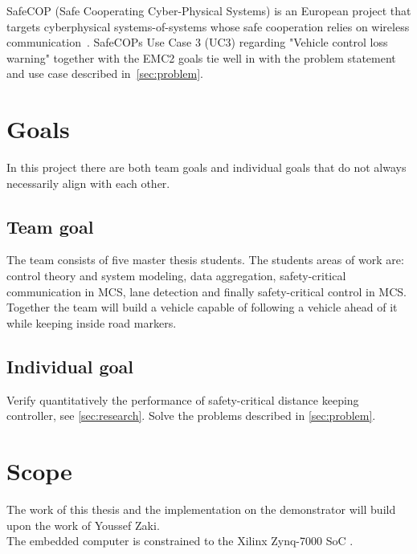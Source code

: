 SafeCOP (Safe Cooperating Cyber-Physical Systems) is an European project that targets cyberphysical systems-of-systems whose safe cooperation relies on wireless communication~\cite{safecop2016}. SafeCOPs Use Case 3 (UC3) regarding "Vehicle control loss warning" together with the EMC2 goals tie well in with the problem statement and use case described in~\ref{sec:problem}. %

\section{Goals}
In this project there are both team goals and individual goals that do not always necessarily align with each other.

\subsection{Team goal}
The team consists of five master thesis students. The students areas of work are: control theory and system modeling, data aggregation, safety-critical communication in MCS, lane detection and finally safety-critical control in MCS. Together the team will build a vehicle capable of following a vehicle ahead of it while keeping inside road markers.

\subsection{Individual goal}
Verify quantitatively the performance of safety-critical distance keeping controller, see \ref{sec:research}. Solve the problems described in \ref{sec:problem}.

\section{Scope}
\label{sec:scope}
The work of this thesis and the implementation on the demonstrator will build upon the work of Youssef Zaki\cite{zaki2016}.\\

The embedded computer is constrained to the Xilinx Zynq-7000 SoC \cite{website:xilinx}.\\

